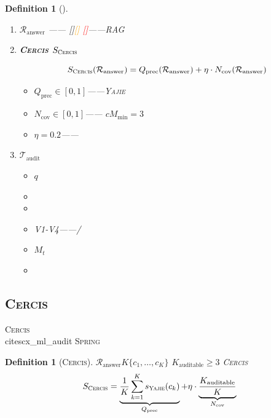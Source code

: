 \documentclass[12pt,a4paper]{article}
\newtheorem{definition}[theorem]{Definition}
\theoremstyle{remark}
\newcommand{\Spring}{\textsc{Spring}}
\newcommand{\Yajie}{\textsc{Yajie}}
\newcommand{\Cercis}{\textsc{Cercis}}
\begin{document}
\begin{definition}[]\label{def:output_components}
\begin{enumerate}[label=(\arabic*),leftmargin=*,itemsep=3pt]
    \item \textbf{ $\mathcal{R}_{\text{answer}}$}
    ——
    \textcolor{green!50!black}{[]}\textcolor{orange}{[]}
    \textcolor{red}{[]}——RAG
    
    \item \textbf{\Cercis{} $S_{\Cercis}$}
    
    \begin{equation}\label{eq:cercis_framework}
        S_{\Cercis}(\mathcal{R}_{\text{answer}}) = Q_{\text{prec}}(\mathcal{R}_{\text{answer}}) + \eta \cdot N_{\text{cov}}(\mathcal{R}_{\text{answer}})
    \end{equation}
    
    \begin{itemize}[nosep]
        \item $Q_{\text{prec}} \in [0,1]$——\Yajie{}
        \item $N_{\text{cov}} \in [0,1]$——
        $c$$M_{\min}=3$
        \item $\eta = 0.2$——
    \end{itemize}
    
    \item \textbf{ $\mathcal{T}_{\text{audit}}$}
    
    \begin{itemize}[nosep]
        \item $q$
        \item 
        \item 
        \item V1-V4——/
        \item $M_t$
        \item 
    \end{itemize}
\end{enumerate}
\end{definition}

\subsection{\Cercis{}}

\Cercis{}~\\cite{scx_ml_audit}
\Spring{}

\begin{definition}[\Cercis{}]\label{def:multimodal_cercis}
$\mathcal{R}_{\text{answer}}$$K$$\{c_1, \ldots, c_K\}$
$K_{\text{auditable}}$$\geq 3$
\Cercis{}
\begin{equation}\label{eq:multimodal_cercis}
    S_{\Cercis} = \underbrace{\frac{1}{K}\sum_{k=1}^{K} s_{\Yajie}(c_k)}_{Q_{\text{prec}}} 
    + \eta \cdot \underbrace{\frac{K_{\text{auditable}}}{K}}_{N_{\text{cov}}}
\end{equation}
\end{definition}
\end{document}
